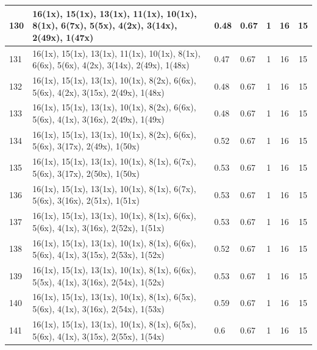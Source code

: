 \begin{small}
\begin{longtable}{|p{0.5cm}|p{9cm}|p{1.3cm}|p{1.3cm}|c|c|c|}
  130 & 16(1x), 15(1x), 13(1x), 11(1x), 10(1x), 8(1x), 6(7x), 5(5x), 4(2x), 3(14x), 2(49x), 1(47x) & \cellcolor{colorGood}  0.48 & \cellcolor{colorGood} 0.67 & 1 & 16 & \cellcolor{colorBad} 15 \\   \hline
  131 & 16(1x), 15(1x), 13(1x), 11(1x), 10(1x), 8(1x), 6(6x), 5(6x), 4(2x), 3(14x), 2(49x), 1(48x) & \cellcolor{colorGood}  0.47 & \cellcolor{colorGood} 0.67 & 1 & 16 & \cellcolor{colorBad} 15 \\   \hline
  132 & 16(1x), 15(1x), 13(1x), 10(1x), 8(2x), 6(6x), 5(6x), 4(2x), 3(15x), 2(49x), 1(48x) & \cellcolor{colorGood}  0.48 & \cellcolor{colorGood} 0.67 & 1 & 16 & \cellcolor{colorBad} 15 \\   \hline
  133 & 16(1x), 15(1x), 13(1x), 10(1x), 8(2x), 6(6x), 5(6x), 4(1x), 3(16x), 2(49x), 1(49x) & \cellcolor{colorGood}  0.48 & \cellcolor{colorGood} 0.67 & 1 & 16 & \cellcolor{colorBad} 15 \\   \hline
  134 & 16(1x), 15(1x), 13(1x), 10(1x), 8(2x), 6(6x), 5(6x), 3(17x), 2(49x), 1(50x) & \cellcolor{colorGood}  0.52 & \cellcolor{colorGood} 0.67 & 1 & 16 & \cellcolor{colorBad} 15 \\   \hline
  135 & 16(1x), 15(1x), 13(1x), 10(1x), 8(1x), 6(7x), 5(6x), 3(17x), 2(50x), 1(50x) & \cellcolor{colorGood}  0.53 & \cellcolor{colorGood} 0.67 & 1 & 16 & \cellcolor{colorBad} 15 \\   \hline
  136 & 16(1x), 15(1x), 13(1x), 10(1x), 8(1x), 6(7x), 5(6x), 3(16x), 2(51x), 1(51x) & \cellcolor{colorGood}  0.53 & \cellcolor{colorGood} 0.67 & 1 & 16 & \cellcolor{colorBad} 15 \\   \hline
  137 & 16(1x), 15(1x), 13(1x), 10(1x), 8(1x), 6(6x), 5(6x), 4(1x), 3(16x), 2(52x), 1(51x) & \cellcolor{colorGood}  0.53 & \cellcolor{colorGood} 0.67 & 1 & 16 & \cellcolor{colorBad} 15 \\   \hline
  138 & 16(1x), 15(1x), 13(1x), 10(1x), 8(1x), 6(6x), 5(6x), 4(1x), 3(15x), 2(53x), 1(52x) & \cellcolor{colorGood}  0.52 & \cellcolor{colorGood} 0.67 & 1 & 16 & \cellcolor{colorBad} 15 \\   \hline
  139 & 16(1x), 15(1x), 13(1x), 10(1x), 8(1x), 6(6x), 5(5x), 4(1x), 3(16x), 2(54x), 1(52x) & \cellcolor{colorGood}  0.53 & \cellcolor{colorGood} 0.67 & 1 & 16 & \cellcolor{colorBad} 15 \\   \hline
  140 & 16(1x), 15(1x), 13(1x), 10(1x), 8(1x), 6(5x), 5(6x), 4(1x), 3(16x), 2(54x), 1(53x) & \cellcolor{colorOK}  0.59 & \cellcolor{colorOK} 0.67 & 1 & 16 & \cellcolor{colorBad} 15 \\   \hline
  141 & 16(1x), 15(1x), 13(1x), 10(1x), 8(1x), 6(5x), 5(6x), 4(1x), 3(15x), 2(55x), 1(54x) & \cellcolor{colorOK}  0.6 & \cellcolor{colorOK} 0.67 & 1 & 16 & \cellcolor{colorBad} 15 \\   \hline

\end{longtable}
\end{small}
